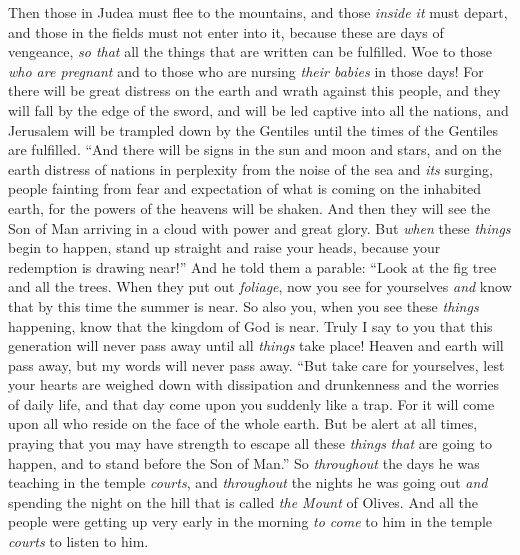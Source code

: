 \begin{biblechapter}
\verse Then those in Judea must flee to the mountains, and those \textit{inside it} must depart, and those in the fields must not enter into it,
\verse because these are days of vengeance, \textit{so that} all the things that are written can be fulfilled.
\verse Woe to those \textit{who are pregnant} and to those who are nursing \textit{their babies} in those days! For there will be great distress on the earth and wrath against this people,
\verse and they will fall by the edge of the sword, and will be led captive into all the nations, and Jerusalem will be trampled down by the Gentiles until the times of the Gentiles are fulfilled.
 “And there will be signs in the sun and moon and stars, and on the earth distress of nations in perplexity from the noise of the sea and \textit{its} surging,
\verse people fainting from fear and expectation of what is coming on the inhabited earth, for the powers of the heavens will be shaken.
\verse And then they will see the Son of Man arriving in a cloud with power and great glory.
\verse But \textit{when} these \textit{things} begin to happen, stand up straight and raise your heads, because your redemption is drawing near!”
 And he told them a parable: “Look at the fig tree and all the trees.
\verse When they put out \textit{foliage}, now you see for yourselves \textit{and} know that by this time the summer is near.
\verse So also you, when you see these \textit{things} happening, know that the kingdom of God is near.
\verse Truly I say to you that this generation will never pass away until all \textit{things} take place!
\verse Heaven and earth will pass away, but my words will never pass away.
 “But take care for yourselves, lest your hearts are weighed down with dissipation and drunkenness and the worries of daily life, and that day come upon you suddenly
\verse like a trap. For it will come upon all who reside on the face of the whole earth.
\verse But be alert at all times, praying that you may have strength to escape all these \textit{things} \textit{that} are going to happen, and to stand before the Son of Man.”
\verse So \textit{throughout} the days he was teaching in the temple \textit{courts}, and \textit{throughout} the nights he was going out \textit{and} spending the night on the hill that is called \textit{the Mount} of Olives.
\verse And all the people were getting up very early in the morning \textit{to come} to him in the temple \textit{courts} to listen to him.
\end{biblechapter}

